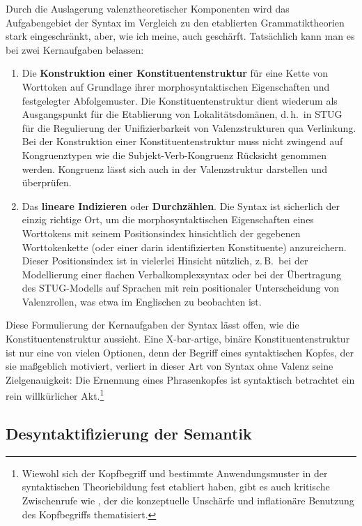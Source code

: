 {Durch die Auslagerung valenztheoretischer Komponenten wird das Aufgabengebiet der Syntax im Vergleich zu den etablierten Grammatiktheorien stark eingeschränkt, aber, wie ich meine, auch geschärft. Tatsächlich kann man es bei zwei Kernaufgaben belassen: 

\begin{enumerate}
  \item Die {\bf Konstruktion einer Konstituentenstruktur} für eine Kette von Worttoken auf Grundlage ihrer morphosyntaktischen Eigenschaften und festgelegter Abfolgemuster. Die Konstituentenstruktur dient wiederum als Ausgangspunkt für die Etablierung von Lokalitätsdomänen, d.\,h.\ in STUG für die Regulierung der Unifizierbarkeit von Valenzstrukturen qua Verlinkung. Bei der Konstruktion einer Konstituentenstruktur muss nicht zwingend auf  Kongruenztypen wie die Subjekt-Verb-Kongruenz Rücksicht genommen werden. Kongruenz lässt sich auch in der Valenzstruktur darstellen und überprüfen.   
  \item Das {\bf lineare Indizieren} oder {\bf Durchzählen}. Die Syntax ist sicherlich der einzig richtige Ort, um die morphosyntaktischen Eigenschaften eines Worttokens mit seinem Positionsindex hinsichtlich der gegebenen Worttokenkette (oder einer darin identifizierten Konstituente) anzureichern. Dieser Positionsindex ist in vielerlei Hinsicht nützlich, z.\,B.\ bei der Modellierung einer flachen Verbalkomplexsyntax oder bei der Übertragung des STUG-Modells auf Sprachen mit rein positionaler Unterscheidung von Valenzrollen, was etwa im Englischen zu beobachten ist.  
\end{enumerate}  
Diese Formulierung der Kernaufgaben der Syntax lässt offen, wie die Konstituentenstruktur aussieht. Eine X-bar-artige, binäre Konstituentenstruktur ist nur eine von vielen Optionen, denn der Begriff eines syntaktischen Kopfes, der sie ma\ss geblich motiviert, verliert in dieser Art von Syntax ohne Valenz seine Zielgenauigkeit: Die Ernennung eines Phrasenkopfes ist syntaktisch betrachtet ein rein willkürlicher Akt.\footnote{Wiewohl sich der Kopfbegriff und bestimmte Anwendungsmuster in der syntaktischen Theoriebildung fest etabliert haben, gibt es auch kritische Zwischenrufe wie \cite{Matthews:07}, der die konzeptuelle Unschärfe und inflationäre Benutzung des Kopfbegriffs thematisiert.}
   

  



\subsection{Desyntaktifizierung der Semantik}

}
